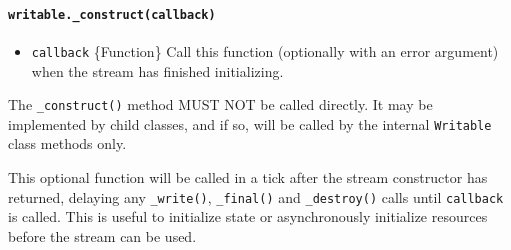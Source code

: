 \paragraph{\texorpdfstring{\texttt{writable.\_construct(callback)}}{writable.\_construct(callback)}}\label{writable._constructcallback}

\begin{itemize}
\tightlist
\item
  \texttt{callback} \{Function\} Call this function (optionally with an
  error argument) when the stream has finished initializing.
\end{itemize}

The \texttt{\_construct()} method MUST NOT be called directly. It may be
implemented by child classes, and if so, will be called by the internal
\texttt{Writable} class methods only.

This optional function will be called in a tick after the stream
constructor has returned, delaying any \texttt{\_write()},
\texttt{\_final()} and \texttt{\_destroy()} calls until
\texttt{callback} is called. This is useful to initialize state or
asynchronously initialize resources before the stream can be used.

